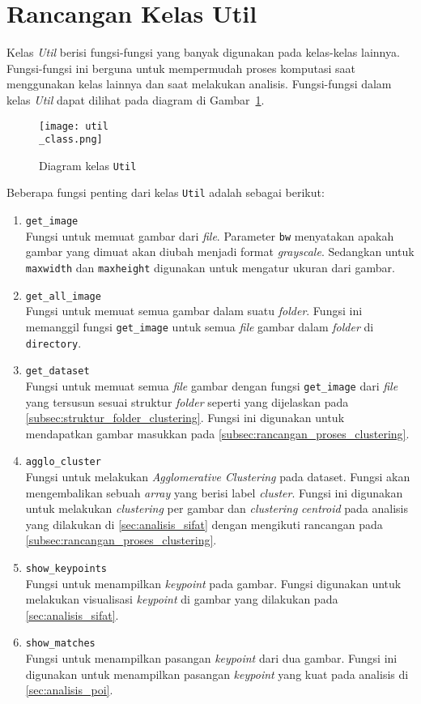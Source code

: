 \section{Rancangan Kelas Util}
Kelas \textit{Util} berisi fungsi-fungsi yang banyak digunakan pada kelas-kelas lainnya. Fungsi-fungsi ini berguna untuk mempermudah proses komputasi saat menggunakan kelas lainnya dan saat melakukan analisis. Fungsi-fungsi dalam kelas \textit{Util} dapat dilihat pada diagram di Gambar~\ref{fig:util_class}.
\begin{figure}[H]
	\centering
	\texttt{[image: util\\\_class.png]}
	\caption{Diagram kelas \texttt{Util}}
	\label{fig:util_class}
\end{figure}
Beberapa fungsi penting dari kelas \texttt{Util} adalah sebagai berikut:
\begin{enumerate}
	\item \texttt{get\_image} \\
	Fungsi untuk memuat gambar dari \textit{file}. Parameter \texttt{bw} menyatakan apakah gambar yang dimuat akan diubah menjadi format \textit{grayscale}. Sedangkan untuk \texttt{maxwidth} dan \texttt{maxheight} digunakan untuk mengatur ukuran dari gambar.
	\item \texttt{get\_all\_image} \\
	Fungsi untuk memuat semua gambar dalam suatu \textit{folder}. Fungsi ini memanggil fungsi \texttt{get\_image} untuk semua \textit{file} gambar dalam \textit{folder} di \texttt{directory}.
	\item \texttt{get\_dataset} \\
	Fungsi untuk memuat semua \textit{file} gambar dengan fungsi \texttt{get\_image} dari \textit{file} yang tersusun sesuai struktur \textit{folder} seperti yang dijelaskan pada \ref{subsec:struktur_folder_clustering}. Fungsi ini digunakan untuk mendapatkan gambar masukkan pada \ref{subsec:rancangan_proses_clustering}.
	\item \texttt{agglo\_cluster} \\
	Fungsi untuk melakukan \textit{Agglomerative Clustering} pada dataset. Fungsi akan mengembalikan sebuah \textit{array} yang berisi label \textit{cluster}. Fungsi ini digunakan untuk melakukan \textit{clustering} per gambar dan \textit{clustering} \textit{centroid} pada analisis yang dilakukan di \ref{sec:analisis_sifat} dengan mengikuti rancangan pada \ref{subsec:rancangan_proses_clustering}.
	\item \texttt{show\_keypoints} \\
	Fungsi untuk menampilkan \textit{keypoint} pada gambar. Fungsi digunakan untuk melakukan visualisasi \textit{keypoint} di gambar yang dilakukan pada \ref{sec:analisis_sifat}.
	\item \texttt{show\_matches} \\
	Fungsi untuk menampilkan pasangan \textit{keypoint} dari dua gambar. Fungsi ini digunakan untuk menampilkan pasangan \textit{keypoint} yang kuat pada analisis di \ref{sec:analisis_poi}.
\end{enumerate}


